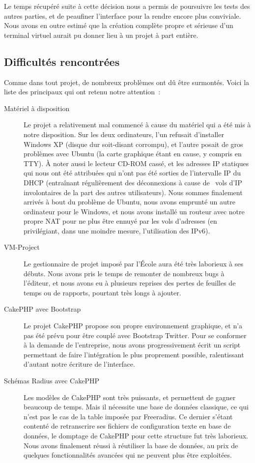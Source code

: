 Le temps récupéré suite à cette décision nous a permis de poursuivre les tests des autres parties, et de peaufiner l'interface pour la rendre encore plus conviviale. Nous avons en outre estimé que la création complète propre et sérieuse d'un terminal virtuel aurait pu donner lieu à un projet à part entière.

\subsection{Difficultés rencontrées}

Comme dans tout projet, de nombreux problèmes ont dû être surmontés. Voici la liste des principaux qui ont retenu notre attention~:

\begin{description}
\item[Matériel à disposition] Le projet a relativement mal commencé à cause du matériel qui a été mis à notre disposition. Sur les deux ordinateurs, l'un refusait d'installer Windows XP (disque dur soit-disant corrompu), et l'autre posait de gros problèmes avec Ubuntu (la carte graphique étant en cause, y compris en TTY). À noter aussi le lecteur CD-ROM cassé, et les adresses IP statiques qui nous ont été attribuées qui n'ont pas été sorties de l'intervalle IP du DHCP (entraînant régulièrement des déconnexions à cause de \og~vols d'IP~\fg{} involontaires de la part des autres utilisateurs). Nous sommes finalement arrivés à bout du problème de Ubuntu, nous avons emprunté un autre ordinateur pour le Windows, et nous avons installé un routeur avec notre propre NAT pour ne plus être ennuyé par les vols d'adresses (en privilégiant, dans une moindre mesure, l'utilisation des IPv6).
\item[VM-Project] Le gestionnaire de projet imposé par l'École aura été très laborieux à ses débuts. Nous avons pris le temps de remonter de nombreux bugs à l'éditeur, et nous avons eu à plusieurs reprises des pertes de feuilles de temps ou de rapports, pourtant très longs à ajouter.
\item[CakePHP avec Bootstrap] Le projet CakePHP propose son propre environnement graphique, et n'a pas été prévu pour être couplé avec Bootstrap Twitter. Pour se conformer à la demande de l'entreprise, nous avons progressivement écrit un script permettant de faire l'intégration le plus proprement possible, ralentissant d'autant notre écriture de l'interface.
\item[Schémas Radius avec CakePHP] Les modèles de CakePHP sont très puissants, et permettent de gagner beaucoup de temps. Mais il nécessite une base de données classique, ce qui n'est pas le cas de la table imposée par Freeradius. Ce dernier s'étant contenté de retranscrire ses fichiers de configuration texte en base de données, le domptage de CakePHP pour cette structure fut très laborieux. Nous avons finalement réussi à réutiliser la base de données, au prix de quelques fonctionnalités avancées qui ne peuvent plus être exploitées.

\end{description}
